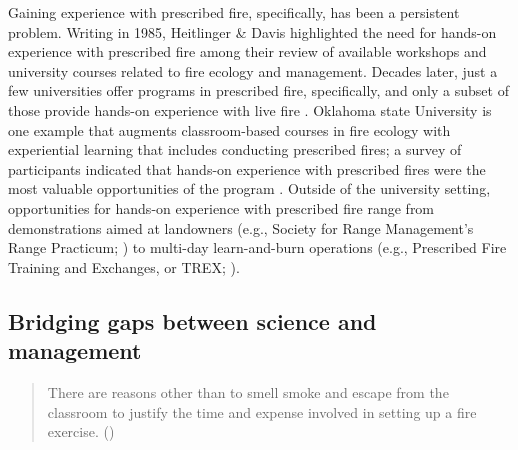 \documentclass[fire,article,submit,moreauthors,pdftex]{Definitions/mdpi}
\begin{document}
Gaining experience with prescribed fire, specifically, has been a persistent problem.
Writing in 1985, Heitlinger \& Davis \citep{heitlinger1985} highlighted the need for hands-on experience with prescribed fire among their review of available workshops and university courses related to fire ecology and management.
Decades later, just a few universities offer programs in prescribed fire, specifically, and only a subset of those provide hands-on experience with live fire \citep{kobziar2009}.
Oklahoma state University is one example that augments classroom-based courses in fire ecology with experiential learning that includes conducting prescribed fires; a survey of participants indicated that hands-on experience with prescribed fires were the most valuable opportunities of the program \citep{scasta2015}.
Outside of the university setting, opportunities for hands-on experience with prescribed fire range from demonstrations aimed at landowners (e.g., Society for Range Management's Range Practicum; \citep{barnes2021}) to multi-day learn-and-burn operations (e.g., Prescribed Fire Training and Exchanges, or TREX; \citep{spencer2015}).

\hypertarget{bridging-gaps-between-science-and-management}{%
\subsection{Bridging gaps between science and management}\label{bridging-gaps-between-science-and-management}}

\begin{quote}
There are reasons other than to smell smoke and escape from the classroom to justify the time and expense involved in setting up a fire exercise. (\citet[][p.~50]{andrews1989})
\end{quote}
\end{document}
